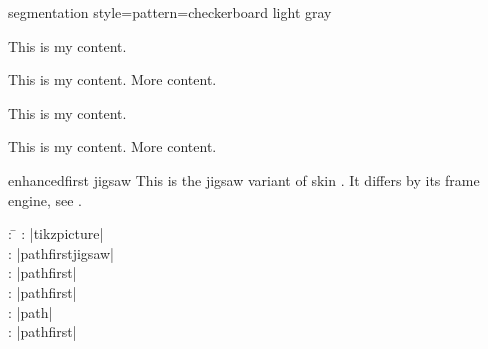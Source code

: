 \begin{dispExample*}{segmentation style={pattern=checkerboard light gray}}
\begin{tcbraster}[enhanced jigsaw,raster equal height,raster columns=4,
    colback=LightGreen,colframe=DarkGreen,colbacktitle=LimeGreen!75!DarkGreen,
    opacityframe=0.5,opacityback=0.5,opacitybacktitle=0.5,
    left=1mm,right=1mm,top=1mm,bottom=1mm,middle=1mm]
  \begin{tcolorbox}
    This is my content.
  \end{tcolorbox}
  \begin{tcolorbox}
    This is my content.
    \tcblower
    More content.
  \end{tcolorbox}
  \begin{tcolorbox}[adjusted title=My title]
    This is my content.
  \end{tcolorbox}
  \begin{tcolorbox}[adjusted title=My title]
    This is my content.
    \tcblower
    More content.
  \end{tcolorbox}
\end{tcbraster}
\end{dispExample*}


\clearpage
\begin{docSkin}{enhancedfirst jigsaw}
  This is the jigsaw variant of skin .
  It differs by its frame engine, see .
\begin{tcolorbox}[skintable=enhancedfirst jigsaw]
  \begin{tabbing}
    : \=\kill
    :  \> |tikzpicture|\\ 
    :           \> |pathfirstjigsaw|\\
    : \> |pathfirst|\\ 
    :        \> |pathfirst|\\
    :    \> |path|\\
    :           \> |pathfirst|
  \end{tabbing}
\end{tcolorbox}
\end{docSkin}


